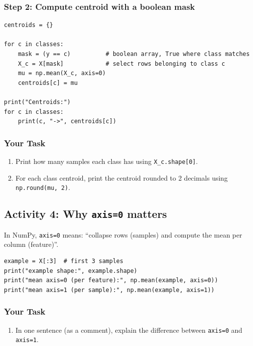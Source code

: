 \subsubsection{Step 2: Compute centroid with a boolean mask}
\begin{verbatim}
centroids = {}

for c in classes:
    mask = (y == c)          # boolean array, True where class matches
    X_c = X[mask]            # select rows belonging to class c
    mu = np.mean(X_c, axis=0)
    centroids[c] = mu

print("Centroids:")
for c in classes:
    print(c, "->", centroids[c])
\end{verbatim}

\subsubsection{Your Task}
\begin{enumerate}
    \item Print how many samples each class has using \texttt{X\_c.shape[0]}.
    \item For each class centroid, print the centroid rounded to 2 decimals using \texttt{np.round(mu, 2)}.
\end{enumerate}

\newpage
\subsection{Activity 4: Why \texttt{axis=0} matters}

\noindent
In NumPy, \texttt{axis=0} means: “collapse rows (samples) and compute the mean per column (feature)”.

\begin{verbatim}
example = X[:3]  # first 3 samples
print("example shape:", example.shape)
print("mean axis=0 (per feature):", np.mean(example, axis=0))
print("mean axis=1 (per sample):", np.mean(example, axis=1))
\end{verbatim}

\subsubsection{Your Task}
\begin{enumerate}
    \item In one sentence (as a comment), explain the difference between \texttt{axis=0} and \texttt{axis=1}.
\end{enumerate}

